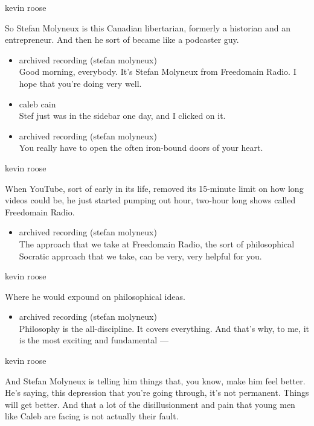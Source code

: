 kevin roose

So Stefan Molyneux is this Canadian libertarian, formerly a historian
and an entrepreneur. And then he sort of became like a podcaster guy.

\begin{itemize}
\item
  archived recording (stefan molyneux)\\
  Good morning, everybody. It's Stefan Molyneux from Freedomain Radio. I
  hope that you're doing very well.
\item
  caleb cain\\
  Stef just was in the sidebar one day, and I clicked on it.
\item
  archived recording (stefan molyneux)\\
  You really have to open the often iron-bound doors of your heart.
\end{itemize}

kevin roose

When YouTube, sort of early in its life, removed its 15-minute limit on
how long videos could be, he just started pumping out hour, two-hour
long shows called Freedomain Radio.

\begin{itemize}
\tightlist
\item
  archived recording (stefan molyneux)\\
  The approach that we take at Freedomain Radio, the sort of
  philosophical Socratic approach that we take, can be very, very
  helpful for you.
\end{itemize}

kevin roose

Where he would expound on philosophical ideas.

\begin{itemize}
\tightlist
\item
  archived recording (stefan molyneux)\\
  Philosophy is the all-discipline. It covers everything. And that's
  why, to me, it is the most exciting and fundamental ---
\end{itemize}

kevin roose

And Stefan Molyneux is telling him things that, you know, make him feel
better. He's saying, this depression that you're going through, it's not
permanent. Things will get better. And that a lot of the disillusionment
and pain that young men like Caleb are facing is not actually their
fault.

